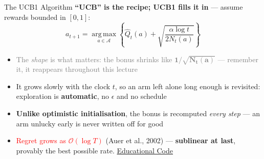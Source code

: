 \begin{frame}{The UCB1 Algorithm}
\textbf{``UCB'' is the recipe; UCB1 fills it in} --- assume rewards bounded in $[0,1]$:
\[
    a_{t+1} = \operatorname*{arg\,max}_{a \in \mathcal{A}} \left\{ \hat{Q}_t(a) + \sqrt{\frac{\alpha \log t}{2 N_t(a)}} \right\}
\]
\begin{itemize}
    \setlength{\itemsep}{0.5em}
    \item \textcolor{gray}{The \emph{shape} is what matters: the bonus shrinks like $\mathbf{1/\sqrt{N_t(a)}}$ --- remember it, it reappears throughout this lecture}
    \item It grows slowly with the clock $t$, so an arm left alone long enough is revisited: exploration is \textbf{automatic}, no $\epsilon$ and no schedule
    \item \textbf{Unlike optimistic initialisation}, the bonus is recomputed \emph{every step} --- an arm unlucky early is never written off for good
    \item \textcolor{red}{Regret grows as $\mathcal{O}(\log T)$} (Auer et al., 2002) --- \textbf{sublinear at last}, provably the best possible rate. \href{https://github.com/TikhonJelvis/RL-book/tree/master/rl/chapter14/ucb1.py}{Educational Code}
\end{itemize}
\end{frame}

